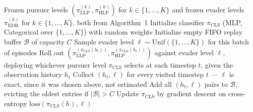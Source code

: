 
\begin{algorithm}
\caption{DAgger Classifier Training (Pursuit-Level Selection)}
\label{alg:dagger}
\begin{algorithmic}[1]
\Require Frozen pursuer levels $(\pi_{\mathrm{LLP}}^{(k)}, \pi_{\mathrm{HLP}}^{(k)})$ for $k \in \{1,\dots,K\}$ and frozen evader levels $\pi_{\mathrm{EDR}}^{(k)}$ for $k \in \{1,\dots,K\}$, both from Algorithm~1
\State Initialize classifier $\pi_{\mathrm{CLS}}$ (MLP, Categorical over $\{1,\dots,K\}$) with random weights
\State Initialize empty FIFO replay buffer $\mathcal{B}$ of capacity $C$
    \State Sample evader level $\ell \sim \mathrm{Unif}(\{1,\dots,K\})$ for this batch of episodes
    \State Roll out $\left(\pi_{\mathrm{LLP}}^{(\pi_{\mathrm{CLS}}(h_t))}, \pi_{\mathrm{HLP}}^{(\pi_{\mathrm{CLS}}(h_t))}\right)$ against evader level $\ell$, deploying whichever pursuer level $\pi_{\mathrm{CLS}}$ selects at each timestep $t$, given the observation history $h_t$
    \State Collect $(h_t, \ell)$ for every visited timestep $t$ --- $\ell$ is exact, since it was chosen above, not estimated
    \State Add all $(h_t, \ell)$ pairs to $\mathcal{B}$, evicting the oldest entries if $|\mathcal{B}| > C$
            \State Update $\pi_{\mathrm{CLS}}$ by gradient descent on cross-entropy $\mathrm{loss}(\pi_{\mathrm{CLS}}(h), \ell)$
        \EndFor
    \EndFor
\EndFor
\end{algorithmic}
\end{algorithm}
